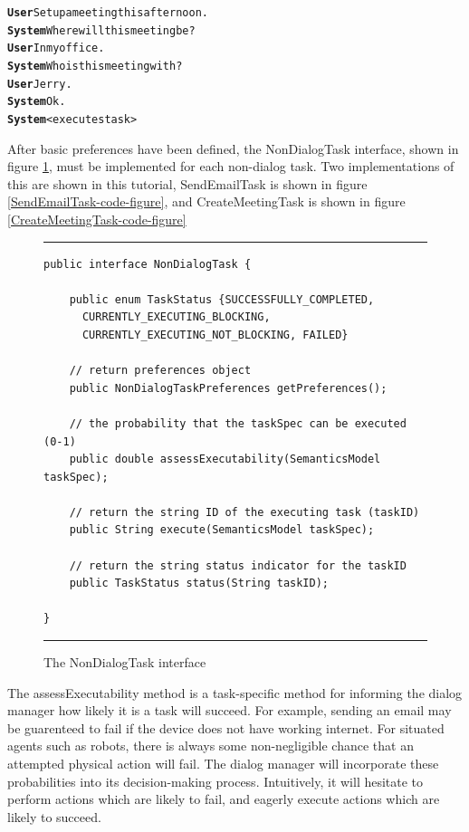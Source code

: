 \documentclass[10pt]{article}
\begin{document}
\begin{alltt}
\textbf{User} Set up a meeting this afternoon.
\textbf{System} Where will this meeting be?
\textbf{User} In my office.
\textbf{System} Who is this meeting with?
\textbf{User} Jerry.
\textbf{System} Ok.
\textbf{System} <executes task>
\end{alltt}


After basic preferences have been defined, the NonDialogTask interface, shown in figure \ref{NonDialogTask-interface-code-figure}, must be implemented for each non-dialog task.
Two implementations of this are shown in this tutorial, SendEmailTask is shown in figure \ref{SendEmailTask-code-figure}, and CreateMeetingTask is shown in figure \ref{CreateMeetingTask-code-figure}

\begin{figure}[ht*]
\centering
\rule{\textwidth}{1pt}
\small
\begin{verbatim}
public interface NonDialogTask {

    public enum TaskStatus {SUCCESSFULLY_COMPLETED, 
      CURRENTLY_EXECUTING_BLOCKING,
      CURRENTLY_EXECUTING_NOT_BLOCKING, FAILED}

    // return preferences object
    public NonDialogTaskPreferences getPreferences();

    // the probability that the taskSpec can be executed (0-1)
    public double assessExecutability(SemanticsModel taskSpec);

    // return the string ID of the executing task (taskID)
    public String execute(SemanticsModel taskSpec);

    // return the string status indicator for the taskID
    public TaskStatus status(String taskID);

}
\end{verbatim}
\rule{\textwidth}{1pt}
\caption{The NonDialogTask interface}
\label{NonDialogTask-interface-code-figure}
\end{figure}


The assessExecutability method is a task-specific method for informing the dialog manager how likely it is a task will succeed.
For example, sending an email may be guarenteed to fail if the device does not have working internet.
For situated agents such as robots, there is always some non-negligible chance that an attempted physical action will fail.
The dialog manager will incorporate these probabilities into its decision-making process.
Intuitively, it will hesitate to perform actions which are likely to fail, and eagerly execute actions which are likely to succeed.
\end{document}
